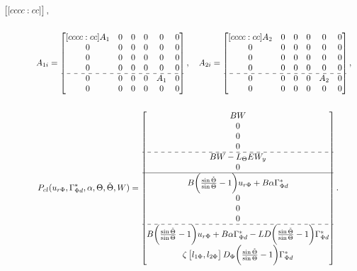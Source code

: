 \documentclass[main.tex]{subfiles}
\begin{document}
\begin{align*}
\begin{bmatrix}[cccc:cc]
		\end{bmatrix},\nonumber \\
		\nonumber \\
		A_{1i} &= 
		\begin{bmatrix}[cccc:cc]
		A_1 & 0 & 0 & 0 & 0 & 0\\
		0 & 0 & 0 & 0 & 0 & 0\\
		0 & 0 & 0 & 0 & 0 & 0\\
		0 & 0 & 0 & 0 & 0 & 0\\ \hdashline
		0 & 0 & 0 & 0 & A_1 & 0\\ 
		0 & 0 & 0 & 0 & 0 & 0
		\end{bmatrix}, \quad
		A_{2i} = 
		\begin{bmatrix}[cccc:cc]
		A_2 & 0 & 0 & 0 & 0 & 0\\
		0 & 0 & 0 & 0 & 0 & 0\\
		0 & 0 & 0 & 0 & 0 & 0\\
		0 & 0 & 0 & 0 & 0 & 0\\ \hdashline
		0 & 0 & 0 & 0 & A_2 & 0\\ 
		0 & 0 & 0 & 0 & 0 & 0
		\end{bmatrix}, \nonumber \\
	\nonumber \\
		P_{cl}&(u_{r\Phi},\Gamma_{\Phi d}^*,\alpha, \Theta,\check{\Theta},W) = \begin{bmatrix}
		BW \\
		0 \\
		0 \\
		0 \\ \hdashline
		BW - L_\Theta E W_y\\
		0 \\ \hline
		B \bigg(\frac{\sin \check{\Theta}}{\sin \Theta} - 1\bigg) u_{r\Phi} + B\alpha\Gamma_{\Phi d}^*\\
		0 \\
		0 \\
		0 \\ \hdashline
		B \bigg(\frac{\sin \check{\Theta}}{\sin \Theta} - 1\bigg) u_{r\Phi} + B\alpha\Gamma_{\Phi d}^* - LD\bigg( \frac{\sin \check{\Theta}}{\sin \Theta}-1\bigg)\Gamma_{\Phi d}^*\\
		\zeta \begin{bmatrix}l_{1\Phi} , l_{2\Phi}\end{bmatrix} D_\Phi\bigg( \frac{\sin \check{\Theta}}{\sin \Theta} - 1\bigg)\Gamma_{\Phi d}^* \\		
		\end{bmatrix}.
		\\\nonumber
	\end{align*}
	
\end{document}
